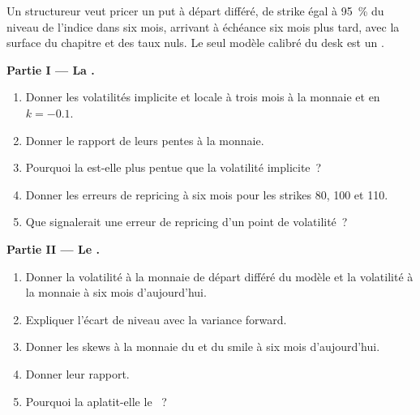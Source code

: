 \begin{problem}\label{pb:dv:local-volatility:1}
Un structureur veut pricer un put à départ différé, de strike égal à 95~\% du niveau de l'indice dans six mois,
arrivant à échéance six mois plus tard, avec la surface du chapitre et des taux nuls. Le seul modèle calibré du desk est un .

\medskip\noindent\textbf{Partie I --- La .}
\begin{enumerate}
\item Donner les volatilités implicite et locale à trois mois à la monnaie et en $k=-0.1$.
\item Donner le rapport de leurs pentes à la monnaie.
\item Pourquoi la  est-elle plus pentue que la volatilité implicite~?
\item Donner les erreurs de repricing à six mois pour les strikes 80, 100 et 110.
\item Que signalerait une erreur de repricing d'un point de volatilité~?
\end{enumerate}

\medskip\noindent\textbf{Partie II --- Le .}
\begin{enumerate}[resume]
\item Donner la volatilité à la monnaie de départ différé du modèle et la volatilité à la monnaie à six mois d'aujourd'hui.
\item Expliquer l'écart de niveau avec la variance forward.
\item Donner les skews à la monnaie du  et du smile à six mois d'aujourd'hui.
\item Donner leur rapport.
\item Pourquoi la  aplatit-elle le ~?
\end{enumerate}


\end{problem}
